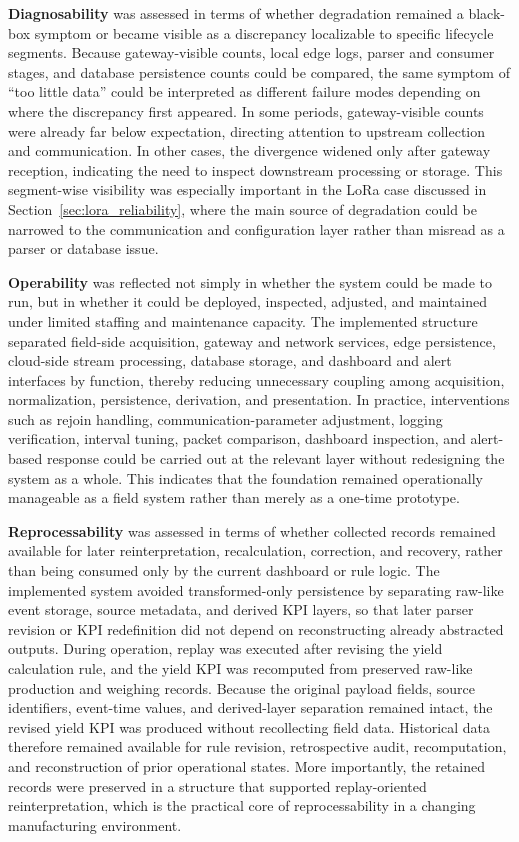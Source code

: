 \documentclass[systems,article,submit,pdftex,moreauthors]{Definitions/mdpi}
\begin{document}
\textbf{Diagnosability} was assessed in terms of whether degradation remained a black-box symptom or became visible as a discrepancy localizable to specific lifecycle segments. Because gateway-visible counts, local edge logs, parser and consumer stages, and database persistence counts could be compared, the same symptom of ``too little data'' could be interpreted as different failure modes depending on where the discrepancy first appeared. In some periods, gateway-visible counts were already far below expectation, directing attention to upstream collection and communication. In other cases, the divergence widened only after gateway reception, indicating the need to inspect downstream processing or storage. This segment-wise visibility was especially important in the LoRa case discussed in Section~\ref{sec:lora_reliability}, where the main source of degradation could be narrowed to the communication and configuration layer rather than misread as a parser or database issue.

\textbf{Operability} was reflected not simply in whether the system could be made to run, but in whether it could be deployed, inspected, adjusted, and maintained under limited staffing and maintenance capacity. The implemented structure separated field-side acquisition, gateway and network services, edge persistence, cloud-side stream processing, database storage, and dashboard and alert interfaces by function, thereby reducing unnecessary coupling among acquisition, normalization, persistence, derivation, and presentation. In practice, interventions such as rejoin handling, communication-parameter adjustment, logging verification, interval tuning, packet comparison, dashboard inspection, and alert-based response could be carried out at the relevant layer without redesigning the system as a whole. This indicates that the foundation remained operationally manageable as a field system rather than merely as a one-time prototype.

\textbf{Reprocessability} was assessed in terms of whether collected records remained available for later reinterpretation, recalculation, correction, and recovery, rather than being consumed only by the current dashboard or rule logic. The implemented system avoided transformed-only persistence by separating raw-like event storage, source metadata, and derived KPI layers, so that later parser revision or KPI redefinition did not depend on reconstructing already abstracted outputs. During operation, replay was executed after revising the yield calculation rule, and the yield KPI was recomputed from preserved raw-like production and weighing records. Because the original payload fields, source identifiers, event-time values, and derived-layer separation remained intact, the revised yield KPI was produced without recollecting field data. Historical data therefore remained available for rule revision, retrospective audit, recomputation, and reconstruction of prior operational states. More importantly, the retained records were preserved in a structure that supported replay-oriented reinterpretation, which is the practical core of reprocessability in a changing manufacturing environment.
\end{document}
